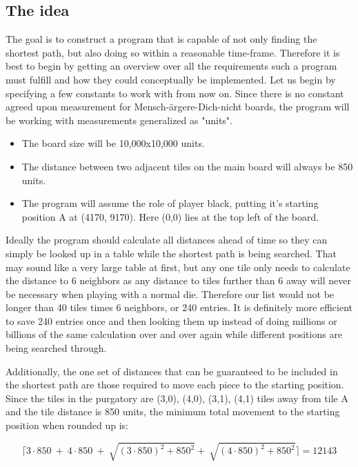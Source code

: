 \documentclass[12pt]{article} %
\begin{document}
\subsection{The idea}
The goal is to construct a program that is capable of not only finding the shortest path, but also doing so within a reasonable time-frame. Therefore it is best to begin by getting an overview over all the requirements such a program must fulfill and how they could conceptually be implemented. Let us begin by specifying a few constants to work with from now on. Since there is no constant agreed upon measurement for Mensch-ärgere-Dich-nicht boards, the program will be working with measurements generalized as "units".
\begin{itemize}
    \item The board size will be 10,000x10,000 units.
    \item The distance between two adjacent tiles on the main board will always be 850 units.
    \item The program will assume the role of player black, putting it's starting position A at (4170, 9170). Here (0,0) lies at the top left of the board.
\end{itemize}

Ideally the program should calculate all distances ahead of time so they can simply be looked up in a table while the shortest path is being searched. That may sound like a very large table at first, but any one tile only needs to calculate the distance to 6 neighbors as any distance to tiles further than 6 away will never be necessary when playing with a normal die. Therefore our list would not be longer than 40 tiles times 6 neighbors, or 240 entries. It is definitely more efficient to save 240 entries once and then looking them up instead of doing millions or billions of the same calculation over and over again while different positions are being searched through.

Additionally, the one set of distances that can be guaranteed to be included in the shortest path are those required to move each piece to the starting position. Since the tiles in the purgatory are (3,0), (4,0), (3,1), (4,1) tiles away from tile A and the tile distance is 850 units, the minimum total movement to the starting position when rounded up is:

\[
	\lceil 3\cdot850\ +\ 4\cdot850\ +\ \sqrt{\left(3\cdot850\right)^{2}+850^{2}}+\ \sqrt{\left(4\cdot850\right)^{2}+850^{2}}\rceil = 12143
\]

\newpage
\end{document}
